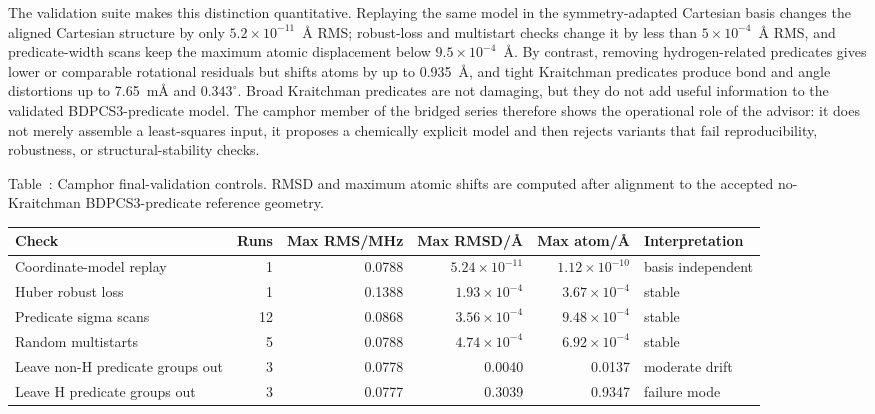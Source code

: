 \documentclass[aip,jcp,reprint,longbibliography,floatfix]{revtex4-2}
\begin{document}
The validation suite makes this distinction quantitative. Replaying the same
model in the symmetry-adapted Cartesian basis changes the aligned Cartesian
structure by only $5.2\times 10^{-11}$~\AA{} RMS; robust-loss and multistart
checks change it by less than $5\times10^{-4}$~\AA{} RMS, and predicate-width
scans keep the maximum atomic displacement below $9.5\times10^{-4}$~\AA{}.
By contrast, removing hydrogen-related predicates gives lower or comparable
rotational residuals but shifts atoms by up to 0.935~\AA{}, and tight
Kraitchman predicates produce bond and angle distortions up to 7.65~m\AA{}
and $0.343^\circ$. Broad Kraitchman predicates are not damaging, but they do
not add useful information to the validated BDPCS3-predicate model. The
camphor member of the bridged series therefore shows the operational role of
the advisor: it does not merely assemble a least-squares input, it proposes a
chemically explicit model and then rejects variants that fail reproducibility,
robustness, or structural-stability checks.

\begin{widetext}
\begin{center}
\label{tab:camphor-final-validation}
\parbox{0.96\textwidth}{\small\raggedright Table~\thetable: Camphor
final-validation controls. RMSD and maximum atomic shifts are computed after
alignment to the accepted no-Kraitchman BDPCS3-predicate reference geometry.\par}
\smallskip
\footnotesize
\setlength{\tabcolsep}{4pt}
\begin{tabular}{lrrrrl}
\toprule
Check & Runs & Max RMS/MHz & Max RMSD/\AA{} & Max atom/\AA{} & Interpretation \\
\midrule
Coordinate-model replay & 1 & 0.0788 & $5.24\times10^{-11}$ & $1.12\times10^{-10}$ & basis independent \\
Huber robust loss & 1 & 0.1388 & $1.93\times10^{-4}$ & $3.67\times10^{-4}$ & stable \\
Predicate sigma scans & 12 & 0.0868 & $3.56\times10^{-4}$ & $9.48\times10^{-4}$ & stable \\
Random multistarts & 5 & 0.0788 & $4.74\times10^{-4}$ & $6.92\times10^{-4}$ & stable \\
Leave non-H predicate groups out & 3 & 0.0778 & 0.0040 & 0.0137 & moderate drift \\
Leave H predicate groups out & 3 & 0.0777 & 0.3039 & 0.9347 & failure mode \\
\bottomrule
\end{tabular}
\end{center}
\end{widetext}
\end{document}
